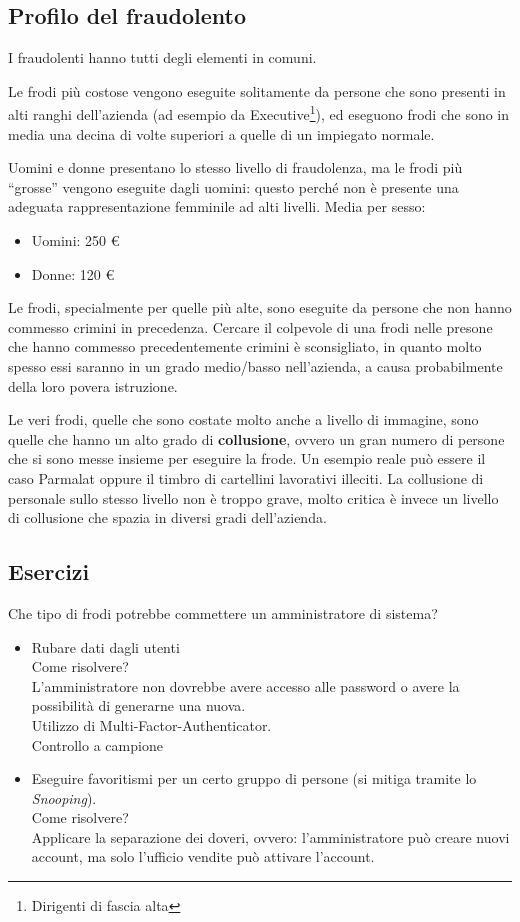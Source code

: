 \subsection{Profilo del fraudolento}

I fraudolenti hanno tutti degli elementi in comuni.

Le frodi più costose vengono eseguite solitamente da persone che sono presenti 
in alti ranghi dell'azienda (ad esempio da Executive\footnote{Dirigenti di 
fascia alta}), ed eseguono frodi che sono in media una decina di volte 
superiori a quelle di un impiegato normale.

Uomini e donne presentano lo stesso livello di fraudolenza, ma le frodi più 
``grosse'' vengono eseguite dagli uomini: questo perché non è presente una 
adeguata rappresentazione femminile ad alti livelli.
Media per sesso:
\begin{itemize}
	\item Uomini: 250 \euro
	\item Donne: 120 \euro
\end{itemize}

Le frodi, specialmente per quelle più alte, sono eseguite da persone che non 
hanno commesso crimini in precedenza.
Cercare il colpevole di una frodi nelle presone che hanno commesso 
precedentemente crimini è sconsigliato, in quanto molto spesso essi saranno in 
un grado medio/basso nell'azienda, a causa probabilmente della loro povera 
istruzione.

Le veri frodi, quelle che sono costate molto anche a livello di immagine, sono 
quelle che hanno un alto grado di \textbf{collusione}, ovvero un gran numero di 
persone che si sono messe insieme per eseguire la frode. Un esempio reale può 
essere il caso Parmalat oppure il timbro di cartellini lavorativi illeciti. La 
collusione di personale sullo stesso livello non è troppo grave, molto critica 
è invece un livello di collusione che spazia in diversi gradi dell'azienda.

\subsection{Esercizi}

Che tipo di frodi potrebbe commettere un amministratore di sistema?
\begin{itemize}
	\item Rubare dati dagli utenti \\
	Come risolvere? \\
	L'amministratore non dovrebbe avere accesso alle password o avere la 
	possibilità di generarne una nuova. \\
	Utilizzo di Multi-Factor-Authenticator. \\
	Controllo a campione
	\item Eseguire favoritismi per un certo gruppo di persone (si mitiga tramite 
	lo \textit{Snooping}). \\
	Come risolvere? \\
	Applicare la separazione dei doveri, ovvero: l'amministratore può creare 
	nuovi account, ma solo l'ufficio vendite può attivare l'account.
\end{itemize}

